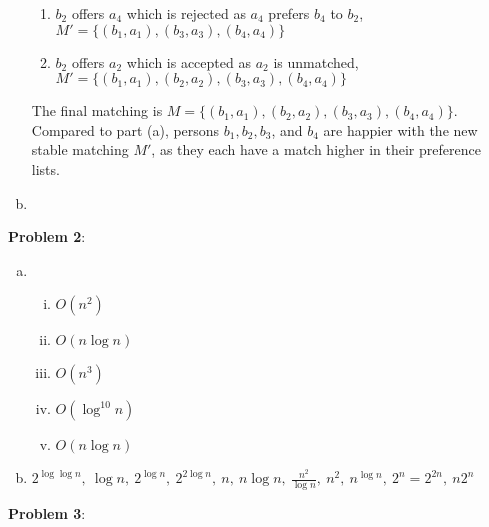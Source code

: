 \documentclass{article}
\begin{document}
\begin{enumerate}[a)]
\begin{enumerate}[1.]
        \item $b_2$ offers $a_4$ which is rejected as $a_4$ prefers $b_4$ to $b_2$, $M' = \{(b_1, a_1), (b_3, a_3), (b_4, a_4)\}$
        \item $b_2$ offers $a_2$ which is accepted as $a_2$ is unmatched, $M' = \{(b_1, a_1), (b_2, a_2), (b_3, a_3), (b_4, a_4)\}$
    \end{enumerate}
    The final matching is $M = \{(b_1, a_1), (b_2, a_2), (b_3, a_3), (b_4, a_4)\}$. Compared to part (a), persons $b_1, b_2, b_3$, and $b_4$ are happier with the new stable matching $M'$, as they each have a match higher in their preference lists. 
    \item
\end{enumerate}
\textbf{Problem 2}:
\begin{enumerate}[a)]
    \item 
    \begin{enumerate}[(i)]
        \item $O(n^2)$
        \item $O(n \log n)$
        \item $O(n^3)$
        \item $O(\log^{10} n)$
        \item $O(n \log n)$
    \end{enumerate}
    \item $2^{\log \log n},\ \log n,\ 2^{\log n},\ 2^{2 \log n},\ n,\ n \log n,\ \frac{n^2}{\log n},\ n^2,\ n^{\log n},\ 2^n = 2^{2n},\ n2^n$
\end{enumerate}
\textbf{Problem 3}:
\end{document}
